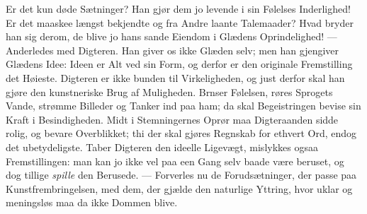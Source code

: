 \documentclass[12pt,a4paper]{book}
\begin{document}
Er det kun døde Sætninger? Han gjør dem jo levende i sin Følelses Inderlighed! Er
det maaskee længst bekjendte og fra Andre laante Talemaader? Hvad bryder han sig
derom, de blive jo hans sande Eiendom i Glædens Oprindelighed! --- Anderledes med
Digteren. Han giver os ikke Glæden selv; men han gjengiver Glædens Idee: Ideen er
Alt ved sin Form, og derfor er den originale Fremstilling det Høieste. Digteren
er ikke bunden til Virkeligheden, og just derfor skal han gjøre den kunstneriske
Brug af Muligheden. Brnser Følelsen, røres Sprogets Vande, strømme Billeder og
Tanker ind paa ham; da skal Begeistringen bevise sin Kraft i Besindigheden. Midt
i Stemningernes Oprør maa Digteraanden sidde rolig, og bevare Overblikket; thi
der skal gjøres Regnskab for ethvert Ord, endog det ubetydeligste. Taber Digteren
den ideelle Ligevægt, mislykkes ogsaa Fremstillingen: man kan jo ikke vel paa een
Gang selv baade være beruset, og dog tillige \emph{spille} den Berusede.
--- Forverles nu de Forudsætninger, der passe paa Kunstfrembringelsen, med dem,
der gjælde den naturlige Yttring, hvor uklar og meningsløs maa da ikke Dommen
blive.
\end{document}
